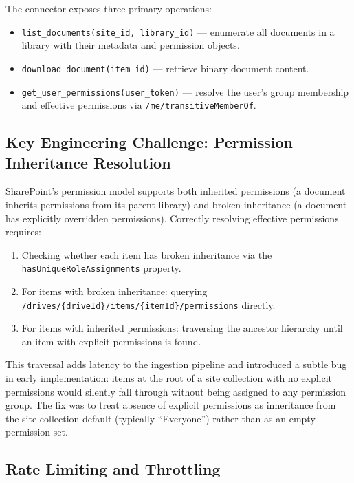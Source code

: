 The connector exposes three primary operations:

\begin{itemize}
  \item \texttt{list\_documents(site\_id, library\_id)} --- enumerate all documents in a library with their metadata and permission objects.
  \item \texttt{download\_document(item\_id)} --- retrieve binary document content.
  \item \texttt{get\_user\_permissions(user\_token)} --- resolve the user's group membership and effective permissions via \texttt{/me/transitiveMemberOf}.
\end{itemize}

\subsection{Key Engineering Challenge: Permission Inheritance Resolution}

SharePoint's permission model supports both inherited permissions (a document inherits permissions from its parent library) and broken inheritance (a document has explicitly overridden permissions). Correctly resolving effective permissions requires:

\begin{enumerate}
  \item Checking whether each item has broken inheritance via the \texttt{hasUniqueRoleAssignments} property.
  \item For items with broken inheritance: querying \texttt{/drives/\{driveId\}/items/\{itemId\}/permissions} directly.
  \item For items with inherited permissions: traversing the ancestor hierarchy until an item with explicit permissions is found.
\end{enumerate}

This traversal adds latency to the ingestion pipeline and introduced a subtle bug in early implementation: items at the root of a site collection with no explicit permissions would silently fall through without being assigned to any permission group. The fix was to treat absence of explicit permissions as inheritance from the site collection default (typically ``Everyone'') rather than as an empty permission set.

\subsection{Rate Limiting and Throttling}

